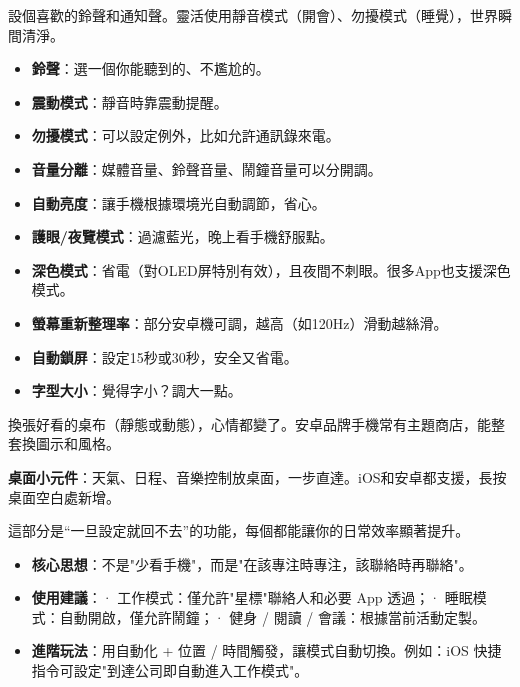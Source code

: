 


設個喜歡的鈴聲和通知聲。靈活使用靜音模式（開會）、勿擾模式（睡覺），世界瞬間清淨。

\begin{itemize}
  \item \textbf{鈴聲}：選一個你能聽到的、不尷尬的。
  \item \textbf{震動模式}：靜音時靠震動提醒。
  \item \textbf{勿擾模式}：可以設定例外，比如允許通訊錄來電。
  \item \textbf{音量分離}：媒體音量、鈴聲音量、鬧鐘音量可以分開調。
\end{itemize}


\begin{itemize}
  \item \textbf{自動亮度}：讓手機根據環境光自動調節，省心。
  \item \textbf{護眼/夜覽模式}：過濾藍光，晚上看手機舒服點。
  \item \textbf{深色模式}：省電（對OLED屏特別有效），且夜間不刺眼。很多App也支援深色模式。
  \item \textbf{螢幕重新整理率}：部分安卓機可調，越高（如120Hz）滑動越絲滑。
  \item \textbf{自動鎖屏}：設定15秒或30秒，安全又省電。
  \item \textbf{字型大小}：覺得字小？調大一點。
\end{itemize}


換張好看的桌布（靜態或動態），心情都變了。安卓品牌手機常有主題商店，能整套換圖示和風格。

\textbf{桌面小元件}：天氣、日程、音樂控制放桌面，一步直達。iOS和安卓都支援，長按桌面空白處新增。


這部分是“一旦設定就回不去”的功能，每個都能讓你的日常效率顯著提升。


\begin{itemize}
  \item \textbf{核心思想}：不是"少看手機"，而是"在該專注時專注，該聯絡時再聯絡"。
  \item \textbf{使用建議}：\newline · 工作模式：僅允許"星標"聯絡人和必要 App 透過；\newline · 睡眠模式：自動開啟，僅允許鬧鐘；\newline · 健身 / 閱讀 / 會議：根據當前活動定製。
  \item \textbf{進階玩法}：用自動化 + 位置 / 時間觸發，讓模式自動切換。例如：iOS 快捷指令可設定"到達公司即自動進入工作模式"。
\end{itemize}

